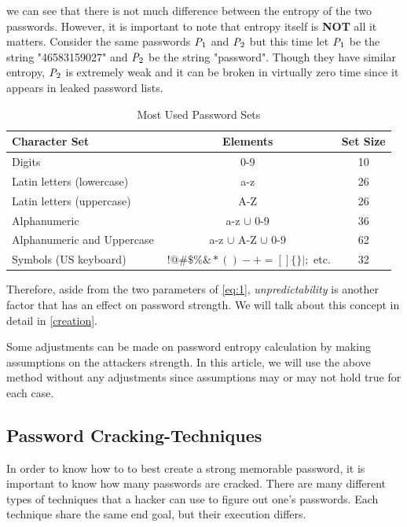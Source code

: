\documentclass[acmsmall,nonacm]{acmart}
\begin{document}
\noindent we can see that there is not much difference between the entropy of the two passwords. However, it is important to note that entropy itself is \textbf{NOT} all it matters. Consider the same passwords $\emph{P}_1$ and $\emph{P}_2$ but this time let $\emph{P}_1$ be the string "46583159027" and $\emph{P}_2$ be the string "password". Though they have similar entropy, $\emph{P}_2$ is extremely weak and it can be broken in virtually zero time since it appears in leaked password lists.
\begin{center}
\begin{table}[ht!]

 \begin{tabular}[c]{| l  c  c |} 
\hline 
 Character Set & Elements & Set Size \\
 \hline\hline
 Digits & 0-9 & 10  \\ 
 \hline
 Latin letters (lowercase) & a-z & 26 \\
 \hline
 Latin letters (uppercase) & A-Z & 26  \\
 \hline
 Alphanumeric & a-z $\cup$  0-9 & 36  \\
 \hline
 Alphanumeric and Uppercase & a-z $\cup$ A-Z $\cup$ 0-9 & 62 \\  
 \hline
 Symbols (US keyboard) & $~!@\#\$\%\&*()-+=[]\{\}|;$ etc. & 32  \\
 \hline
 \end{tabular}
 \caption{Most Used Password Sets}
 \label{tab:sets}
\end{table}
\end{center}
Therefore, aside from the two parameters of \autoref{eq:1}, \emph{unpredictability}  is another factor that has an effect on password strength. We will talk about this concept in detail in \autoref{creation}.

Some adjustments can be made on password entropy calculation by making assumptions on the attackers strength. In this article, we will use the above method without any adjustments since assumptions may or may not hold true for each case. 

\subsection{Password Cracking-Techniques}

In order to know how to to best create a strong memorable password, it is important to know how many passwords are cracked. There are many different types of techniques that a hacker can use to figure out one's passwords. Each technique share the same end goal, but their execution differs.
\end{document}
